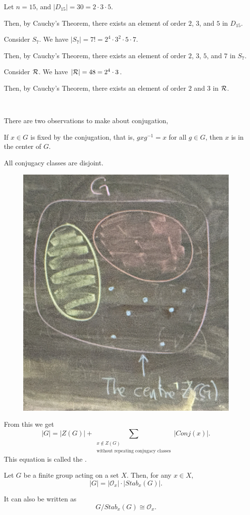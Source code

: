 \begin{example}
    Let $n = 15$, and $|D_{15}| = 30 = 2 \cdot 3 \cdot 5$.

    Then, by Cauchy's Theorem, there exists an element of order $2$, $3$, and $5$ in $D_{15}$.
\end{example}

\begin{example}
    Consider $S_7$. We have $|S_7| = 7! = 2^4 \cdot 3^2 \cdot 5 \cdot 7$.

    Then, by Cauchy's Theorem, there exists an element of order $2$, $3$, $5$, and $7$ in $S_7$.
\end{example}

\begin{example}
    Consider $\mathcal{R}$. We have $|\mathcal{R}| = 48 = 2^4 \cdot 3$.

    Then, by Cauchy's Theorem, there exists an element of order $2$ and $3$ in $\mathcal{R}$.
\end{example}

{~~~}

There are two observations to make about conjugation,
\begin{listu}
    \item If $x \in G$ is fixed by the conjugation, that is, $gxg^{-1} = x$ for all $g \in G$, then $x$ is in the center of $G$.

    \item All conjugacy classes are disjoint. 
\end{listu}

\begin{figure}[ht!]
    \centering
    \includegraphics[width=0.2\linewidth]{figures/conjugacy-class.jpg}
\end{figure}

From this we get \[
        |G| = |Z(G)| + \sum_{\substack{x \notin Z(G) \\\text{without repeating conjugacy classes}}} | Conj(x) |.
\] This equation is called the .

\begin{theorem}\label{thm:orbit-stabilizer}
    Let $G$ be a finite group acting on a set $X$. Then, for any $x \in X$, \[
        | G | =  | \mathcal{O}_x | \cdot | Stab_x(G) |.
    \]

    It can also be written as \[
        G / Stab_x(G) \cong \mathcal{O}_x.
    \]
\end{theorem}

